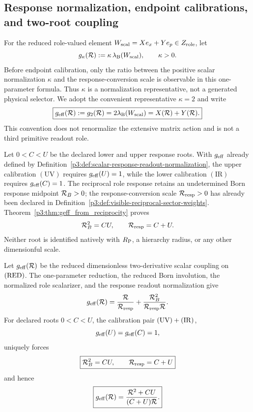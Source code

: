 \documentclass[12pt,a4paper]{article}
\begin{document}
\subsection{Response normalization, endpoint calibrations, and two-root coupling}
\begin{definition}
\label{p3:def:scalar-response-readout-normalization}
For the reduced role-valued element
\(W_{\rm scal}=Xe_x+Ye_p\in Z_{\rm role}\), let
\[
 g_\kappa(\mathcal R):=\kappa\,\lambda_{\rm B}(W_{\rm scal}),
 \qquad \kappa>0.
\]
Before endpoint calibration, only the ratio between the positive scalar
normalization \(\kappa\) and the response-conversion scale is observable in
this one-parameter formula.  Thus \(\kappa\) is a normalization
representative, not a generated physical selector.  We adopt the convenient
representative \(\kappa=2\) and write
\[
 \boxed{g_{\rm eff}(\mathcal R):=g_2(\mathcal R)
 =2\lambda_{\rm B}(W_{\rm scal})=X(\mathcal R)+Y(\mathcal R).}
\]
This convention does not renormalize the extensive matrix action and is not a
third primitive readout role.
\end{definition}

\begin{definition}
\label{p3:def:uv-ir-calibration-pair}
Let \(0<C<U\) be the declared lower and upper response roots.  With
\(g_{\rm eff}\) already defined by
Definition~\ref{p3:def:scalar-response-readout-normalization}, the upper
calibration \((\mathrm{UV})\) requires \(g_{\rm eff}(U)=1\), while the lower
calibration \((\mathrm{IR})\) requires \(g_{\rm eff}(C)=1\).  The reciprocal role response retains an undetermined Born response
midpoint \(\mathcal R_B>0\); the response-conversion scale
\(\mathcal R_{\rm resp}>0\) has already been declared in
Definition~\ref{p3:def:visible-reciprocal-sector-weights}.
Theorem~\ref{p3:thm:geff_from_reciprocity} proves
\[
 \mathcal R_B^2=CU,
 \qquad
 \mathcal R_{\rm resp}=C+U.
\]
Neither root is identified natively with \(R_{\mathrm P}\), a hierarchy radius, or any
other dimensionful scale.
\end{definition}

\begin{theorem}
\label{p3:thm:geff_from_reciprocity}
Let \(g_{\mathrm{eff}}(\mathcal R)\) be the reduced dimensionless two-derivative scalar
coupling on \(({\rm RED})\).  The one-parameter reduction, the reduced Born involution, the normalized
role scalarizer, and the response readout normalization give
\[
 g_{\mathrm{eff}}(\mathcal R)
 =\frac{\mathcal R}{\mathcal R_{\rm resp}}
  +\frac{\mathcal R_B^2}{\mathcal R_{\rm resp}\mathcal R}.
\]
For declared roots \(0<C<U\), the calibration pair
\(({\rm UV})+({\rm IR})\),
\[
 g_{\mathrm{eff}}(U)=g_{\mathrm{eff}}(C)=1,
\]
uniquely forces
\[
 \boxed{\mathcal R_B^2=CU,\qquad \mathcal R_{\rm resp}=C+U}
\]
and hence
\[
\boxed{
 g_{\mathrm{eff}}(\mathcal R)
 =\frac{\mathcal R^2+CU}{(C+U)\mathcal R}.
}
\]
\end{theorem}
\end{document}
